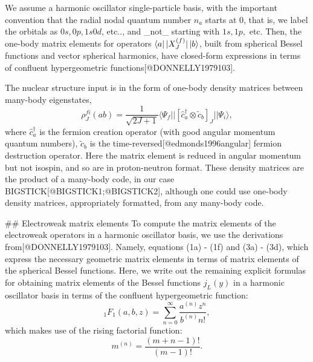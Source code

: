 We assume a harmonic oscillator single-particle basis, with the important
convention that the radial nodal quantum number $n_a$ starts at 0, that is, we
label the orbitals as $0s, 0p, 1s0d$, etc..,
and _not_ starting with $1s, 1p,$ etc.
Then, the one-body matrix elements for operators $\bra{a} |X^{(f)}_J| \ket{b}$,
built from spherical Bessel functions and vector spherical harmonics,  have
closed-form expressions in terms of confluent hypergeometric
functions[@DONNELLY1979103].

The nuclear structure input is in the form of one-body density matrices between
many-body eigenstates,
\begin{equation}
\rho^{fi}_J(ab) = \frac{1}{\sqrt{2J+1} }\langle \Psi_f || [ \hat{c}^\dagger_a \otimes \tilde{c}_b ]_J
|| \Psi_i \rangle, \label{eqn:denmat}
\end{equation}
where $\hat{c}^\dagger_a$ is the fermion creation operator (with good angular
momentum quantum numbers), $\tilde{c}_b$ is the
time-reversed[@edmonds1996angular] fermion destruction operator.  Here the
matrix element is reduced in angular momentum but not isospin, and so are in
proton-neutron format. These density matrices are the product of a many-body
code, in our case BIGSTICK[@BIGSTICK1;@BIGSTICK2], although one could use
one-body density matrices, appropriately formatted, from any many-body code.


## Electroweak matrix elements
To compute the matrix elements of the electroweak operators in a harmonic
oscillator basis, we use the derivations from[@DONNELLY1979103]. Namely,
equations (1a) - (1f) and (3a) - (3d), which express the necessary geometric
matrix elements in terms of matrix elements of the spherical Bessel functions.
Here, we write out the remaining explicit formulas for obtaining matrix elements
of the Bessel functions $j_L(y)$ in a harmonic oscillator basis in terms of the
confluent hypergeometric function:
\begin{equation}
    _1F_1(a,b,z) = \sum_{n=0}^\infty \frac{a^{(n)}z^n}{b^{(n)}n!},
\end{equation}
which makes use of the rising factorial function:
\begin{equation}
    m^{(n)} = \frac{(m+n-1)!}{(m-1)!}.
\end{equation}

